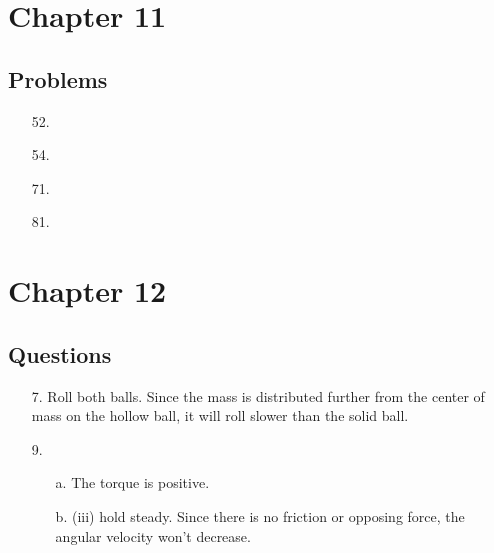 \documentclass[\pointsize, letterpaper]{article}
\newcommand{\horizontal}{\noindent\rule{\hsize}{0.4pt}}
\begin{document}
    \iffalse
    \begin{equation*}
        \begin{gathered}
            Equations go here.
        \end{gathered}
    \end{equation*}

    \resizebox{\hsize}{!}{$Long equation goes here$}

    \begin{multicol*}{# of columns}
    \end{multicol*}

    \horizontal

    \fi


    \section*{Chapter 11}

    \subsection*{Problems}

    \begin{itemize}
        \item [52.]
        \item [54.]
        \item [71.]
        \item [81.]
    \end{itemize}

    \section*{Chapter 12}

    \subsection*{Questions}

    \begin{itemize}
        \item [7.] 
        Roll both balls. Since the mass is distributed further from the center of mass on the hollow ball, it will roll slower than the solid ball.

        \item [9.]

        \begin{itemize}
            \item [a.]
            The torque is positive.
            \item [b.]
            (iii) hold steady. Since there is no friction or opposing force, the angular velocity won't decrease.
        \end{itemize}

    \end{itemize}
\end{document}
